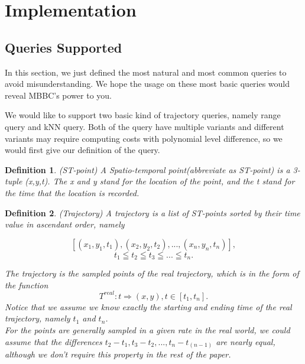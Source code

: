 \documentclass[sigplan]{acmart}
\newtheorem{myDef}{Definition}
\begin{document}
\section{Implementation}
\subsection{Queries Supported}
In this section, we just defined the most natural and most common queries to avoid misunderstanding. We hope the usage on these most basic queries would reveal MBBC's power to you.\par
We would like to support two basic kind of trajectory queries, namely range query and kNN query. Both of the query have multiple variants and different variants may require computing costs with polynomial level difference, so we would first give our definition of the query. \par
\begin{myDef}
  (ST-point) A Spatio-temporal point(abbreviate as ST-point) is a 3-tuple (x,y,t). The x and y stand for the location of the point, and the t stand for the time that the location is recorded.
\end{myDef}
\begin{myDef}
  (Trajectory) A trajectory is a list of ST-points sorted by their time value in ascendant order, namely

     $$[(x_1,y_1,t_1),(x_2,y_2,t_2),...,(x_n,y_n,t_n)], $$
     $$t_1 \leqq t_2 \leqq t_3 \leqq ... \leqq t_n .$$

   The trajectory is the sampled points of the real trajectory, which is in the form of the function
   $$T^{real}: t \Rightarrow (x,y), t\in [t_1,t_n].$$
   Notice that we assume we know exactly the starting and ending time of the real trajectory, namely $t_1$ and $t_n$.\\
   For the points are generally sampled in a given rate in the real world, we could assume that the differences $t_2-t_1, t_3-t_2, ... , t_n- t_(n-1)$ are nearly equal, although we don't require this property in the rest of the paper.
\end{myDef}
\end{document}
